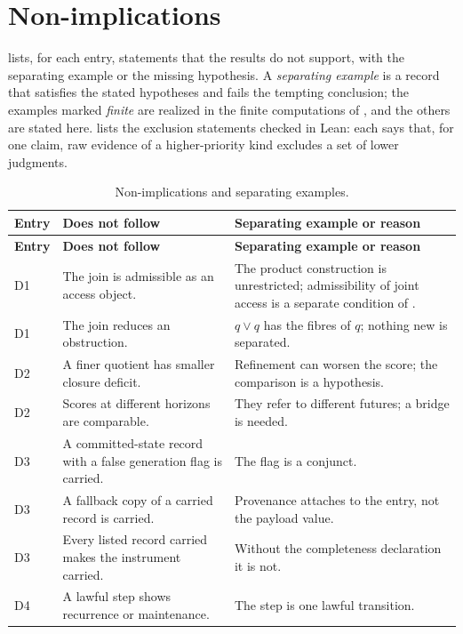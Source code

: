 \section{Non-implications}
\label{supp:nonimpl}

 lists, for each entry, statements that the results do not support, with the
separating example or the missing hypothesis. A \emph{separating example} is a record that satisfies
the stated hypotheses and fails the tempting conclusion; the examples marked \emph{finite} are
realized in the finite computations of , and the others are stated here.
 lists the exclusion statements checked in Lean: each says that, for one
claim, raw evidence of a higher-priority kind excludes a set of lower judgments.

{\small
\begin{longtable}{@{}l>{\raggedright\arraybackslash}p{5.2cm}>{\raggedright\arraybackslash}p{8.0cm}@{}}
\caption{Non-implications and separating examples.}\label{tab:nonimpl}\\
\toprule
\textbf{Entry} & \textbf{Does not follow} & \textbf{Separating example or reason} \\
\midrule
\endfirsthead
\toprule
\textbf{Entry} & \textbf{Does not follow} & \textbf{Separating example or reason} \\
\midrule
\endhead
\bottomrule
\endfoot
D1 & The join is admissible as an access object. & The product construction is unrestricted;
admissibility of joint access is a separate condition of \FoundIV{}. \\
D1 & The join reduces an obstruction. & $q \vee q$ has the fibres of $q$; nothing new is separated. \\
D2 & A finer quotient has smaller closure deficit. & Refinement can worsen the score; the comparison is
a hypothesis. \\
D2 & Scores at different horizons are comparable. & They refer to different futures; a bridge is
needed. \\
D3 & A committed-state record with a false generation flag is carried. & The flag is a conjunct. \\
D3 & A fallback copy of a carried record is carried. & Provenance attaches to the entry, not the
payload value. \\
D3 & Every listed record carried makes the instrument carried. & Without the completeness declaration it
is not. \\
D4 & A lawful step shows recurrence or maintenance. & The step is one lawful transition. \\

\end{longtable}}
